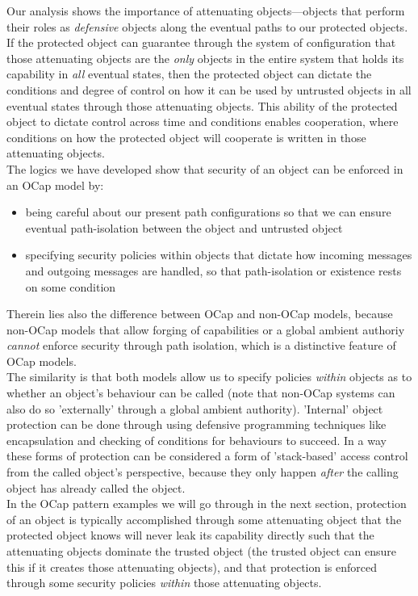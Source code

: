 \documentclass[a4paper,11pt, twoside,twocolumn]{article}
\begin{document}
Our analysis shows the importance of attenuating objects---objects that perform their roles as \textit{defensive} objects along the eventual paths to our protected objects. If the protected object can guarantee through the system of configuration that those attenuating objects are the \textit{only} objects in the entire system that holds its capability in \textit{all} eventual states, then the protected object can dictate the conditions and degree of control on how it can be used by untrusted objects in all eventual states through those attenuating objects. This ability of the protected object to dictate control across time and conditions enables cooperation, where conditions on how the protected object will cooperate is written in those attenuating objects.\\

The logics we have developed show that security of an object can be enforced in an OCap model by:
\begin{itemize}
\item being careful about our present path configurations so that we can ensure eventual path-isolation between the object and untrusted object
\item specifying security policies {within} objects that dictate how incoming messages and outgoing messages are handled, so that path-isolation or existence rests on some condition
\end{itemize}
Therein lies also the difference between OCap and non-OCap models, because non-OCap models that allow forging of capabilities or a global ambient authoriy \textit{cannot} enforce security through path isolation, which is a distinctive feature of OCap models.\\

The similarity is that both models allow us to specify policies \textit{within} objects as to whether an object's behaviour can be called (note that non-OCap systems can also do so 'externally' through a global ambient authority). 'Internal' object protection can be done through using defensive programming techniques like encapsulation and checking of conditions for behaviours to succeed. In a way these forms of protection can be considered a form of 'stack-based' access control from the called object's perspective, because they only happen \textit{after} the calling object has already called the object.\\

In the OCap pattern examples we will go through in the next section, protection of an object is typically accomplished through some attenuating object that the protected object knows will never leak its capability directly such that the attenuating objects dominate the trusted object (the trusted object can ensure this if it creates those attenuating objects), and that protection is enforced through some security policies \textit{within} those attenuating objects.\\
\end{document}
